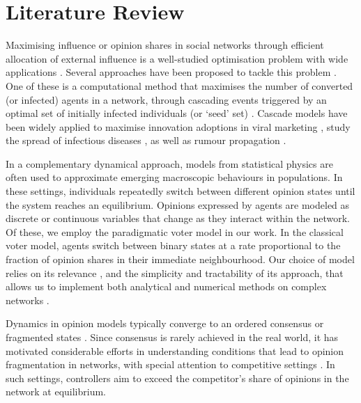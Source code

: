 \section{Literature Review}
\label{background}
Maximising influence or opinion shares in social networks through efficient allocation of external influence is a well-studied optimisation problem with wide applications \cite{easley2010networks,rogers2010diffusion}. Several approaches have been proposed to tackle this problem \cite{noorazar2020recent,li2018influence}. One of these is a computational method that maximises the number of converted (or infected) agents in a network, through cascading events triggered by an optimal set of initially infected individuals (or `seed' set) \cite{kempe2003maximizing}. Cascade models have been widely applied to maximise innovation adoptions in viral marketing \cite{domingos2001mining}, study the spread of infectious diseases \cite{cheng2020outbreak}, as well as rumour propagation \cite{tripathy2010study}. 

In a complementary dynamical approach, models from statistical physics \cite{castellano2009statistical} are often used to approximate emerging macroscopic behaviours in populations. In these settings, individuals repeatedly switch between different opinion states \cite{barrat2008dynamical} until the system reaches an equilibrium. Opinions expressed by agents are modeled as discrete \cite{clifford1973model,galam1999application,holley1975ergodic,krapivsky2003dynamics} or continuous \cite{deffuant2000mixing,hegselmann2002opinion} variables that change as they interact within the network. Of these, we employ the paradigmatic voter model \cite{clifford1973model,holley1975ergodic,sood2005voter} in our work. In the classical voter model, agents switch between binary states at a rate proportional to the fraction of opinion shares in their immediate neighbourhood. Our choice of model relies on its relevance \cite{PMID:28542409}, and the simplicity and tractability of its approach, that allows us to implement both analytical and numerical methods on complex networks \cite{redner2019reality}.

Dynamics in opinion models typically converge to an ordered consensus or fragmented states \cite{castellano2009statistical}. Since consensus is rarely achieved in the real world, it has motivated considerable efforts in understanding conditions that lead to opinion fragmentation in networks, with special attention to competitive settings \cite{hucompeting,prakash2012winner}. In such settings, controllers aim to exceed the competitor's share of opinions in the network at equilibrium.

